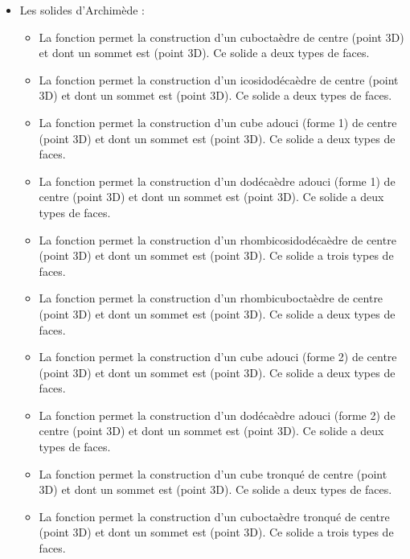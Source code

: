 \begin{itemize}
    \item Les solides d'Archimède :
        \begin{itemize}
            \item La fonction  permet la construction d'un cuboctaèdre de centre  (point 3D) et dont un sommet est  (point 3D). Ce solide a deux types de faces.
            \item La fonction  permet la construction d'un icosidodécaèdre de centre  (point 3D) et dont un sommet est  (point 3D). Ce solide a deux types de faces.
            \item La fonction  permet la construction d'un cube adouci (forme 1) de centre  (point 3D) et dont un sommet est  (point 3D). Ce solide a deux types de faces.
            \item La fonction  permet la construction d'un dodécaèdre adouci (forme 1) de centre  (point 3D) et dont un sommet est  (point 3D). Ce solide a deux types de faces.
            \item La fonction  permet la construction d'un rhombicosidodécaèdre de centre  (point 3D) et dont un sommet est  (point 3D). Ce solide a trois types de faces.
            \item La fonction  permet la construction d'un rhombicuboctaèdre de centre  (point 3D) et dont un sommet est  (point 3D). Ce solide a deux types de faces.
            \item La fonction  permet la construction d'un cube adouci (forme 2) de centre  (point 3D) et dont un sommet est  (point 3D). Ce solide a deux types de faces.
            \item La fonction  permet la construction d'un dodécaèdre adouci (forme 2) de centre  (point 3D) et dont un sommet est  (point 3D). Ce solide a deux types de faces.
            \item La fonction  permet la construction d'un cube tronqué de centre  (point 3D) et dont un sommet est  (point 3D). Ce solide a deux types de faces.
            \item La fonction  permet la construction d'un cuboctaèdre tronqué de centre  (point 3D) et dont un sommet est  (point 3D). Ce solide a trois types de faces.

\end{itemize}
\end{itemize}
